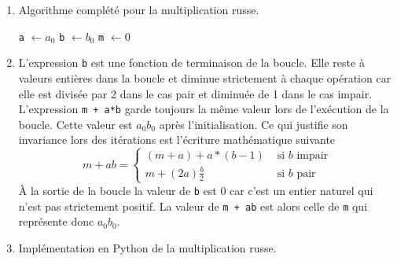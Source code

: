\begin{enumerate}
 \item Algorithme complété pour la multiplication russe.
\begin{algorithm}
 {\tt a} $\leftarrow a_0$\;
 {\tt b} $\leftarrow b_0$\;
 {\tt m} $\leftarrow 0$\;
\end{algorithm}

 \item L'expression \texttt{b} est une fonction de terminaison de la boucle. Elle reste à valeurs entières dans la boucle et diminue strictement à chaque opération car elle est divisée par 2 dans le cas pair et diminuée de 1 dans le cas impair.\newline
 L'expression \texttt{m + a*b} garde toujours la même valeur lors de l'exécution de la boucle. Cette valeur est $a_0b_0$ après l'initialisation. Ce qui justifie son invariance lors des itérations est l'écriture mathématique suivante
\[
 m + ab =
\left\lbrace 
\begin{aligned}
 (m + a) + a*(b-1)   &\text{ si $b$ impair} \\
 m + (2a)\frac{b}{2} &\text{ si $b$ pair}
\end{aligned}
\right. 
\]
\`A la sortie de la boucle la valeur de \texttt{b} est $0$ car c'est un entier naturel qui n'est pas strictement positif. La valeur de \texttt{m + ab} est alors celle de \texttt{m} qui représente donc $a_0b_0$. 
 \item Implémentation en Python de la multiplication russe.

\end{enumerate}
